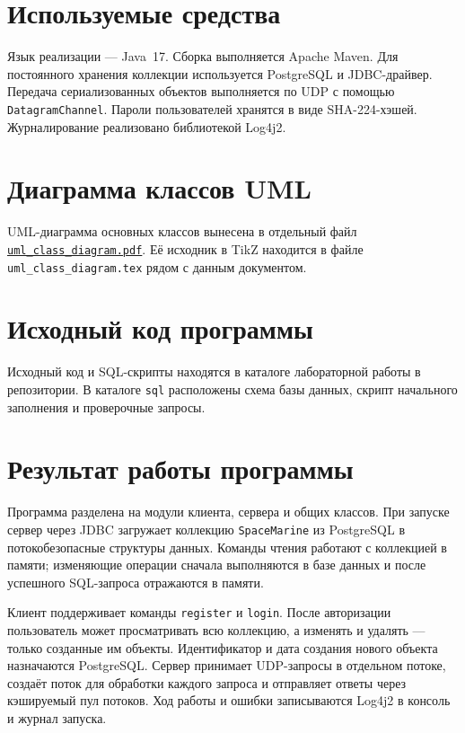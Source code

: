 \documentclass[a4paper,14pt]{extarticle}
\begin{document}
\section{Используемые средства}

Язык реализации --- Java~17. Сборка выполняется Apache Maven. Для постоянного хранения коллекции используется PostgreSQL и JDBC-драйвер. Передача сериализованных объектов выполняется по UDP с помощью \texttt{DatagramChannel}. Пароли пользователей хранятся в виде SHA-224-хэшей. Журналирование реализовано библиотекой Log4j2.

\section{Диаграмма классов UML}

UML-диаграмма основных классов вынесена в отдельный файл \href{uml_class_diagram.pdf}{\texttt{uml\_class\_diagram.pdf}}. Её исходник в TikZ находится в файле \texttt{uml\_class\_diagram.tex} рядом с данным документом.

\section{Исходный код программы}

Исходный код и SQL-скрипты находятся в каталоге лабораторной работы в репозитории. В каталоге \texttt{sql} расположены схема базы данных, скрипт начального заполнения и проверочные запросы.

\section{Результат работы программы}

Программа разделена на модули клиента, сервера и общих классов. При запуске сервер через JDBC загружает коллекцию \texttt{SpaceMarine} из PostgreSQL в потокобезопасные структуры данных. Команды чтения работают с коллекцией в памяти; изменяющие операции сначала выполняются в базе данных и после успешного SQL-запроса отражаются в памяти.

Клиент поддерживает команды \texttt{register} и \texttt{login}. После авторизации пользователь может просматривать всю коллекцию, а изменять и удалять --- только созданные им объекты. Идентификатор и дата создания нового объекта назначаются PostgreSQL. Сервер принимает UDP-запросы в отдельном потоке, создаёт поток для обработки каждого запроса и отправляет ответы через кэшируемый пул потоков. Ход работы и ошибки записываются Log4j2 в консоль и журнал запуска.
\end{document}
